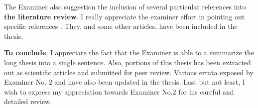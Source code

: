 The Examiner also suggestion the inclusion of several particular references into \textbf{the literature review}.
I really appreciate the examiner effort in pointing out specific references \cite{Argenti_GRSM_2013, Lee_RSReviews_1994, Cetin_ProcSPIE_2000, White_ProcSPIE_1994, Sattar_TIP_1997, Wang_TIP_2004, Nielsen_2012_ICASSP}.
They, and some other articles, have been included in the thesis.


\textbf{To conclude}, I appreciate the fact that the Examiner is able to a summarize the long thesis into a single sentence.
Also, portions of this thesis has been extracted out as scientific articles and submitted for peer review.
Various errata exposed by Examiner No. 2 and have also been updated in the thesis.
Last but not least, I wish to express my appreciation towards Examiner No.2 for his careful and detailed review.

%



